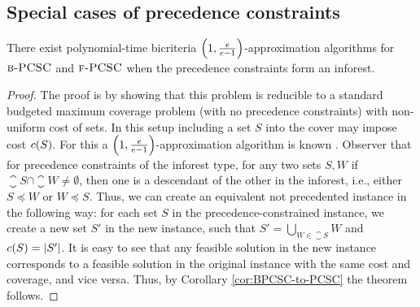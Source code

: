 \subsection{Special cases of precedence constraints} \label{subsection:SpecialCases}
\begin{theorem}\label{thm:BPCSC-inforest}
    There exist polynomial-time bicriteria $\mathopen{}\left( 1, \frac{e}{e-1} \right)$-approximation algorithms for $\textup{\textsc{b-PCSC}}$ and $\textup{\textsc{f-PCSC}}$ when the precedence constraints form an inforest.
\end{theorem}
\begin{proof}
    The proof is by showing that this problem is reducible to a standard budgeted maximum coverage problem (with no precedence constraints) with non-uniform cost of sets. In this setup including a set $S$ into the cover may impose cost $c\mathopen{}\left( S \right)$. For this a $\mathopen{}\left( 1, \frac{e}{e-1} \right)$-approximation algorithm is known \cite{TheBudgetedMaximumCoverageProblem}. Observer that  for precedence constraints of the inforest type, for any two sets $S, W$ if $\closure{S}\cap\closure{W}\neq \emptyset$, then one is a descendant of the other in the inforest, i.e., either $S\preceq W$ or $W\preceq S$. Thus, we can create an equivalent not precedented instance in the following way: for each set $S$ in the precedence-constrained instance, we create a new set $S'$ in the new instance, such that $S'=\bigcup_{W\in \closure{S}}W$ and $c\mathopen{}\left( S \right)=\mathopen{}\left| S' \right|$. It is easy to see that any feasible solution in the new instance corresponds to a feasible solution in the original instance with the same cost and coverage, and vice versa. Thus, by Corollary \ref{cor:BPCSC-to-PCSC} the theorem follows.
\end{proof}

